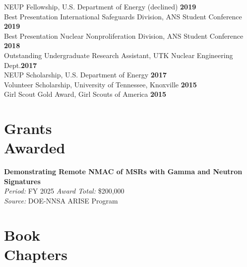 \documentclass[margin,line]{resume}
\begin{document}
\begin{resume}
        NEUP Fellowship, U.S. Department of Energy (declined) \hfill \textbf{2019}\vspace{0.5mm}\\
        Best Presentation International Safeguards Division, ANS Student Conference \hfill \textbf{2019}\vspace{0.5mm}\\%
        Best Presentation Nuclear Nonproliferation Division, ANS Student Conference \hfill \textbf{2018}\vspace{0.5mm}\\%
        Outstanding Undergraduate Research Assistant, UTK Nuclear Engineering Dept.\hfill \textbf{2017}\vspace{.5mm}\\%
        NEUP Scholarship, U.S. Department of Energy \hfill \textbf{2017}\vspace{0.5mm}\\
        Volunteer Scholarship, University of Tennessee, Knoxville \hfill \textbf{2015}\vspace{0.5mm}\\
        Girl Scout Gold Award, Girl Scouts of America \hfill \textbf{2015}

    \section{\mysidestyle Grants\\Awarded}
    \textbf{Demonstrating Remote NMAC of MSRs with Gamma and Neutron Signatures} \\
    \textsl{Period:} FY 2025 \hfill \textsl{Award Total:} \$200,000\\
    \textsl{Source:} DOE-NNSA ARISE Program \hfill\\

    \section{\mysidestyle Book\\Chapters}
      \begin{bibenum}
        \item {}
      \end{bibenum}

\end{resume}
\end{document}
